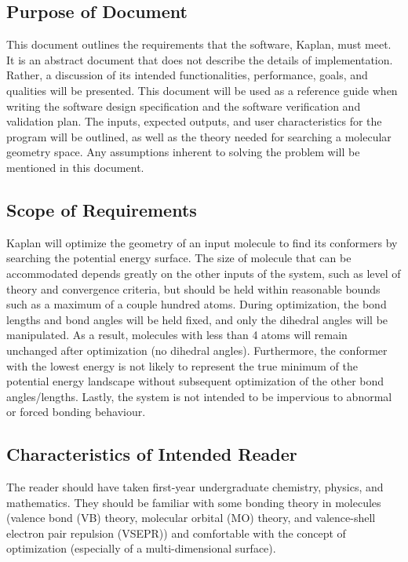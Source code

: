 \documentclass[12pt]{article}
\newcommand{\progname}{Kaplan} %
\begin{document}
\subsection{Purpose of Document}

This document outlines the requirements that the software, \progname{}, must 
meet. It is an abstract document that does not describe the details of 
implementation. Rather, a discussion of its intended functionalities, 
performance, goals, and qualities will be presented. This document will be used 
as a reference guide when writing the software design specification and the 
software verification and validation plan. The inputs, expected outputs, and 
user characteristics for the program will be outlined, as well as the theory 
needed for searching a molecular geometry space. Any assumptions inherent to 
solving the problem will be mentioned in this document. 

\subsection{Scope of Requirements}
Kaplan will optimize the geometry of an input molecule 
to find its conformers 
by searching the potential energy surface. The size of molecule that can be 
accommodated depends greatly on the other inputs of the system, such as level 
of theory and convergence criteria, but should be held within reasonable bounds 
such as a maximum of a couple hundred atoms. During 
optimization, the bond 
lengths and bond angles will be held fixed, and only 
the dihedral angles will 
be manipulated. As a result, molecules with less than 4 atoms will remain 
unchanged after optimization (no dihedral angles). 
Furthermore, the conformer 
with the lowest energy is not likely to represent the true minimum  of the 
potential energy landscape without subsequent 
optimization of the other bond 
angles/lengths. Lastly, the system is not intended to be impervious to abnormal 
or forced bonding behaviour.

\subsection{Characteristics of Intended Reader} 
The reader should have taken first-year undergraduate chemistry, physics, and 
mathematics. They should be familiar with some bonding theory in molecules 
(valence bond (VB) theory, molecular orbital (MO) theory, and valence-shell 
electron pair repulsion (VSEPR)) and comfortable with the concept of 
optimization (especially of a multi-dimensional 
surface). 
\end{document}
